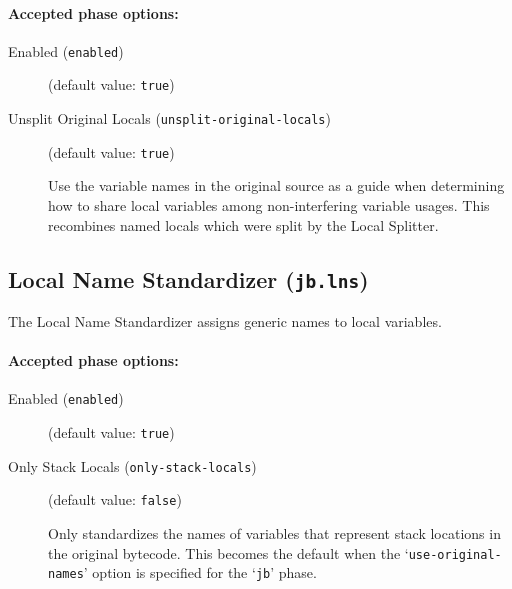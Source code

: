 \documentclass{article}
\begin{document}
\paragraph{Accepted phase options:} 

\begin{description}

\item[Enabled ({\tt enabled})]
(default value: {\tt true})






\item[Unsplit Original Locals ({\tt unsplit-original-locals})]
(default value: {\tt true})




Use the variable names in the original source as a guide when
determining how to share local variables among non-interfering
variable usages. This recombines named locals which were split by
the Local Splitter.



\end{description}

\subsection{Local Name Standardizer ({\tt jb.lns})}

The Local Name Standardizer assigns generic names to local variables.


\paragraph{Accepted phase options:} 

\begin{description}

\item[Enabled ({\tt enabled})]
(default value: {\tt true})






\item[Only Stack Locals ({\tt only-stack-locals})]
(default value: {\tt false})




Only standardizes the names of variables that represent stack
locations in the original bytecode. This becomes the default when
the `{\tt use-original-names}' option is specified for
the `{\tt jb}' phase.



\end{description}
\end{document}
